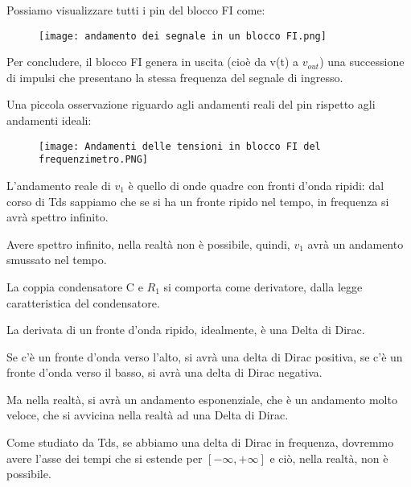 Possiamo visualizzare tutti i pin del blocco FI come: 

\begin{figure}[h]
    \centering
    \texttt{[image: andamento dei segnale in un blocco FI.png]}
\end{figure}

Per concludere, 
il blocco FI genera in uscita (cioè da v(t) a $v_{out}$) una successione di impulsi 
che presentano la stessa frequenza del segnale di ingresso. \newline 

\newpage

Una piccola osservazione riguardo agli andamenti reali del pin rispetto agli andamenti ideali: 

\begin{figure}[h]
    \centering
    \texttt{[image: Andamenti delle tensioni in blocco FI del frequenzimetro.PNG]}
\end{figure}

L'andamento reale di $v_1$ è quello di onde quadre con fronti d'onda ripidi: dal corso di Tds sappiamo che se si ha un fronte ripido nel tempo, in frequenza si avrà spettro infinito. \newline 

Avere spettro infinito, nella realtà non è possibile, quindi, $v_1$ avrà un andamento smussato nel tempo. \newline 

La coppia condensatore C e $R_1$ si comporta come derivatore, dalla legge caratteristica del condensatore. \newline 

La derivata di un fronte d'onda ripido, idealmente, è una Delta di Dirac. \newline 

Se c'è un fronte d'onda verso l'alto, si avrà una delta di Dirac positiva, 
se c'è un fronte d'onda verso il basso, si avrà una delta di Dirac negativa. \newline 

Ma nella realtà, si avrà un andamento esponenziale, che è un andamento molto veloce, che si avvicina nella realtà ad una Delta di Dirac. \newline 

Come studiato da Tds, se abbiamo una delta di Dirac in frequenza, dovremmo avere l'asse dei tempi che si estende per $[- \infty, + \infty]$ e ciò, nella realtà, non è possibile. \newline 

